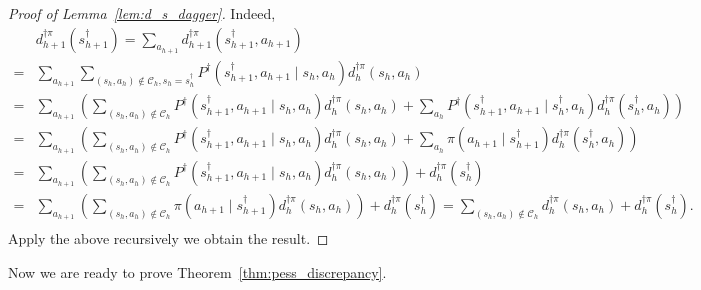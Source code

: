 \begin{proof}[Proof of Lemma~\ref{lem:d_s_dagger}]
	Indeed,
	\begin{align*}
	&d^{\dagger\pi}_{h+1}(s^\dagger_{h+1})=\sum_{a_{h+1}}d^{\dagger\pi}_{h+1}(s^\dagger_{h+1},a_{h+1})\\
	=&\sum_{a_{h+1}}\sum_{(s_h,a_h)\notin\mathcal{C}_h,s_h=s^\dagger_h}P^{\dagger}(s^\dagger_{h+1},a_{h+1}\mid s_h,a_h)d^{\dagger\pi}_h(s_h,a_h)\\
	=&\sum_{a_{h+1}}\left(\sum_{(s_h,a_h)\notin\mathcal{C}_h}P^{\dagger}(s^\dagger_{h+1},a_{h+1}\mid s_h,a_h)d^{\dagger\pi}_h(s_h,a_h)+\sum_{a_h}P^{\dagger}(s^\dagger_{h+1},a_{h+1}\mid s_h^\dagger,a_h)d^{\dagger\pi}_h(s_h^\dagger,a_h)\right)\\
	=&\sum_{a_{h+1}}\left(\sum_{(s_h,a_h)\notin\mathcal{C}_h}P^{\dagger}(s^\dagger_{h+1},a_{h+1}\mid s_h,a_h)d^{\dagger\pi}_h(s_h,a_h)+\sum_{a_h}\pi(a_{h+1}\mid s_{h+1}^\dagger)d^{\dagger\pi}_h(s_h^\dagger,a_h)\right)\\
	=&\sum_{a_{h+1}}\left(\sum_{(s_h,a_h)\notin\mathcal{C}_h}P^{\dagger}(s^\dagger_{h+1},a_{h+1}\mid s_h,a_h)d^{\dagger\pi}_h(s_h,a_h)\right)+d^{\dagger\pi}_h(s_h^\dagger)\\
	=&\sum_{a_{h+1}}\left(\sum_{(s_h,a_h)\notin\mathcal{C}_h}\pi(a_{h+1}\mid s^\dagger_{h+1})d^{\dagger\pi}_h(s_h,a_h)\right)+d^{\dagger\pi}_h(s_h^\dagger)=\sum_{(s_h,a_h)\notin\mathcal{C}_h}d^{\dagger\pi}_h(s_h,a_h)+d^{\dagger\pi}_h(s_h^\dagger).\\
	\end{align*}
	Apply the above recursively we obtain the result. 
\end{proof}


Now we are ready to prove Theorem~\ref{thm:pess_discrepancy}. 

